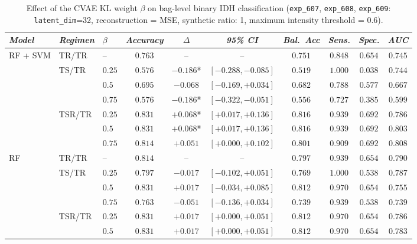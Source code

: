 \begin{table}[H]
\centering
\scriptsize
\setlength{\tabcolsep}{3pt}
\caption{Effect of the CVAE KL weight $\beta$ on bag-level binary IDH classification (\texttt{exp\_607}, \texttt{exp\_608}, \texttt{exp\_609}: \texttt{latent\_dim}=32, reconstruction = MSE, synthetic ratio: 1, maximum intensity threshold = 0.6).}
\label{tab:beta_results}
\begin{tabular*}{\textwidth}{@{\extracolsep{\fill}}lllccccccc}
\toprule
\emph{Model} & \emph{Regimen} & \emph{$\beta$} & \emph{Accuracy} & \emph{$\Delta$} & \emph{95\% CI} & \emph{Bal.\ Acc} & \emph{Sens.} & \emph{Spec.} & \emph{AUC}\\
\midrule
\multirow{7}{*}{RF + SVM} & TR/TR & -- & $0.763$ & -- & -- & $0.751$ & $0.848$ & $0.654$ & $0.745$\\
\cmidrule(lr){2-10}
 & \multirow{3}{*}{TS/TR} & $0.25$ & $0.576$ & $-0.186$* & $[-0.288, -0.085]$ & $0.519$ & $1.000$ & $0.038$ & $0.744$\\
 &  & $0.5$ & $0.695$ & $-0.068$ & $[-0.169, +0.034]$ & $0.682$ & $0.788$ & $0.577$ & $0.667$\\
 &  & $0.75$ & $0.576$ & $-0.186$* & $[-0.322, -0.051]$ & $0.556$ & $0.727$ & $0.385$ & $0.599$\\
\cmidrule(lr){2-10}
 & \multirow{3}{*}{TSR/TR} & $0.25$ & $0.831$ & $+0.068$* & $[+0.017, +0.136]$ & $0.816$ & $0.939$ & $0.692$ & $0.786$\\
 &  & $0.5$ & $0.831$ & $+0.068$* & $[+0.017, +0.136]$ & $0.816$ & $0.939$ & $0.692$ & $0.803$\\
 &  & $0.75$ & $0.814$ & $+0.051$ & $[+0.000, +0.102]$ & $0.801$ & $0.909$ & $0.692$ & $0.808$\\
\midrule
\multirow{7}{*}{RF} & TR/TR & -- & $0.814$ & -- & -- & $0.797$ & $0.939$ & $0.654$ & $0.790$\\
\cmidrule(lr){2-10}
 & \multirow{3}{*}{TS/TR} & $0.25$ & $0.797$ & $-0.017$ & $[-0.102, +0.051]$ & $0.769$ & $1.000$ & $0.538$ & $0.787$\\
 &  & $0.5$ & $0.831$ & $+0.017$ & $[-0.034, +0.085]$ & $0.812$ & $0.970$ & $0.654$ & $0.755$\\
 &  & $0.75$ & $0.763$ & $-0.051$ & $[-0.136, +0.034]$ & $0.739$ & $0.939$ & $0.538$ & $0.739$\\
\cmidrule(lr){2-10}
 & \multirow{3}{*}{TSR/TR} & $0.25$ & $0.831$ & $+0.017$ & $[+0.000, +0.051]$ & $0.812$ & $0.970$ & $0.654$ & $0.786$\\
 &  & $0.5$ & $0.831$ & $+0.017$ & $[+0.000, +0.051]$ & $0.812$ & $0.970$ & $0.654$ & $0.783$\\

\end{tabular*}
\end{table}
